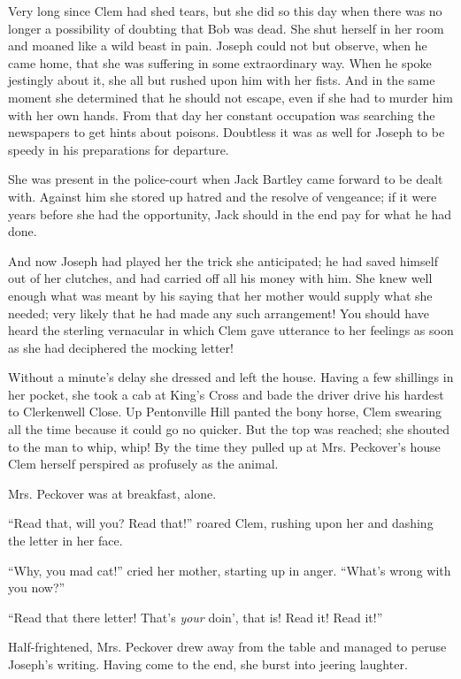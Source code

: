 Very long since Clem had shed tears, but she did so this day when there
was no longer a possibility of doubting that Bob was dead. She shut
herself in her room and moaned like a wild beast in pain. Joseph could
not but observe, when he came home, that she was suffering in some
extraordinary way. When he spoke jestingly about it, she all but rushed
upon him with her fists. And in the same moment she determined that he
should not escape, even if she had to murder him with her own hands.
From that day her constant occupation was searching the newspapers to
get hints about poisons. Doubtless it was as well for Joseph to be
speedy in his preparations for departure.

She was present in the police-court when Jack Bartley came forward to be
dealt with. Against him she stored up hatred and the
{\protect\hypertarget{241}{}{}}resolve of vengeance; if it were years
before she had the opportunity, Jack should in the end pay for what he
had done.

And now Joseph had played her the trick she anticipated; he had saved
himself out of her clutches, and had carried off all his money with him.
She knew well enough what was meant by his saying that her mother would
supply what she needed; very likely that he had made any such
arrangement! You should have heard the sterling vernacular in which Clem
gave utterance to her feelings as soon as she had deciphered the mocking
letter!

Without a minute's delay she dressed and left the house. Having a few
shillings in her pocket, she took a cab at King's Cross and bade the
driver drive his hardest to Clerkenwell Close. Up Pentonville Hill
panted the bony horse, Clem swearing all the time because it could go no
quicker. But the top was reached; she shouted to the man to whip, whip!
By the time they pulled up at Mrs. Peckover's house Clem herself
perspired as profusely as the animal.

Mrs. Peckover was at breakfast, alone.

``Read that, will you? Read that!'' roared
{\protect\hypertarget{242}{}{}}Clem, rushing upon her and dashing the
letter in her face.

``Why, you mad cat!'' cried her mother, starting up in anger. ``What's
wrong with you now?''

``Read that there letter! That's \emph{your} doin', that is! Read it!
Read it!''

Half-frightened, Mrs. Peckover drew away from the table and managed to
peruse Joseph's writing. Having come to the end, she burst into jeering
laughter.

